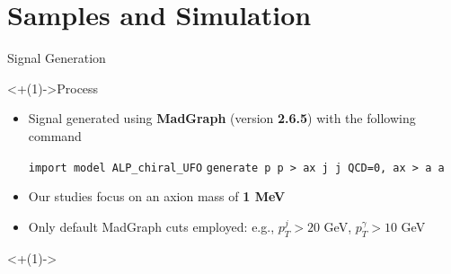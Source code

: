 \documentclass[handout]{beamer}
\begin{document}
%
%
\section{Samples and Simulation}

\begin{frame}{Signal Generation}
    \begin{center}
        \begin{block}<+(1)->{Process}
            \begin{itemize}[<+(1)->]
                \item Signal generated using \textbf{MadGraph} (version \textbf{2.6.5}) with the following command
            
                \smallskip
            
                \texttt{import model ALP\_chiral\_UFO} \newline
                \texttt{generate p p > ax j j QCD=0, ax > a a}
            
                \smallskip
            
                \item Our studies focus on an axion mass of \textbf{1 MeV}
                \item Only default MadGraph cuts employed: e.g., $p_T^j > 20$ GeV, $p_T^\gamma > 10$ GeV
            \end{itemize}
        \end{block}
        
        \bigskip
        
        \uncover<+(1)->{
            }
\end{center}
\end{frame}
\end{document}
